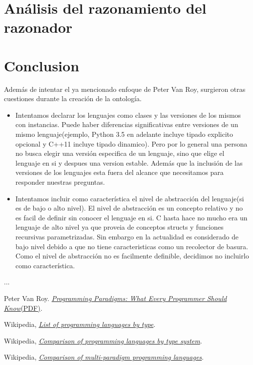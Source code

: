 \documentclass[12pt, titlepage, a4paper]{article}
\begin{document}
\section{Análisis del razonamiento del razonador}


\section{Conclusion}
Además de intentar el ya mencionado enfoque de Peter Van Roy, surgieron otras
cuestiones durante la creación de la ontología.

\begin{itemize}
    \item Intentamos declarar los lenguajes como clases y las versiones de los mismos con instancias.
    Puede haber diferencias significativas entre versiones de un mismo lenguaje(ejemplo, Python 3.5 en adelante
    incluye tipado explicito opcional y C++11 incluye tipado dinamico). Pero por lo general una persona no busca elegir
    una versión especifica de un lenguaje, sino que elige el lenguaje en si y despues una version estable.  Además que
    la inclusión de las versiones de los lenguajes esta fuera del alcance que necesitamos para responder nuestras preguntas.
    \item Intentamos incluir como característica el nivel de abstracción del lenguaje(si es de bajo o alto nivel).
    El nivel de abstracción es un concepto relativo y no es facil de definir sin conocer el lenguaje en si. C hasta hace no mucho
    era un lenguaje de alto nivel ya que proveia de conceptos structs y funciones recursivas parametrizadas. Sin embargo en la actualidad
    es considerado de bajo nivel debido a que no tiene caracteristicas como un recolector de basura. Como el nivel de abstracción no es facilmente
    definible, decidimos no incluirlo como característica.   
\end{itemize}

...


\begin{thebibliography}{999}

      Peter Van Roy. 
      \href{https://webperso.info.ucl.ac.be/~pvr/VanRoyChapter.pdf}{\emph{Programming Paradigms: What Every Programmer Should 
      Know}(PDF)}.
    
      Wikipedia, \href{https://en.wikipedia.org/wiki/List_of_programming_languages_by_type}{\emph{List of programming languages by type}}.
    
      Wikipedia, \href{https://en.wikipedia.org/wiki/Comparison_of_programming_languages_by_type_system}{\emph{Comparison of programming languages by type system}}.
    
      Wikipedia, \href{https://en.wikipedia.org/wiki/Comparison_of_multi-paradigm_programming_languages}{\emph{Comparison of multi-paradigm programming languages}}.
    
    
\end{thebibliography}
\end{document}
